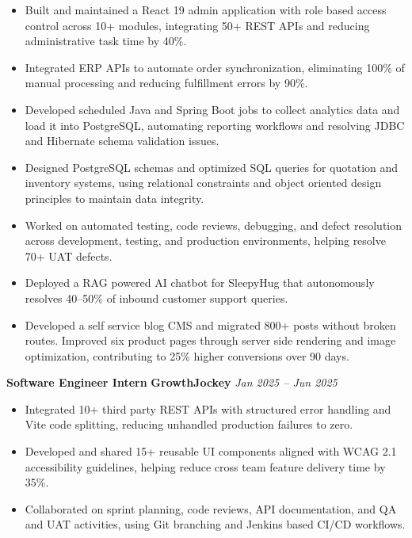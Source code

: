 \documentclass[a4paper,10pt]{article}
\newcommand{\rolerow}[3]{%
    \noindent
    {\bfseries\color{dark}#1}\enspace
    {\bfseries\color{accent}#2}%
    \hfill{\small\color{light}\itshape #3}%
}
\begin{document}
\begin{itemize}

\item Built and maintained a React 19 admin application with role based
access control across 10+ modules, integrating 50+ REST APIs and
reducing administrative task time by 40\%.

\item Integrated ERP APIs to automate order synchronization, eliminating
100\% of manual processing and reducing fulfillment errors by 90\%.

\item Developed scheduled Java and Spring Boot jobs to collect analytics
data and load it into PostgreSQL, automating reporting workflows and
resolving JDBC and Hibernate schema validation issues.

\item Designed PostgreSQL schemas and optimized SQL queries for
quotation and inventory systems, using relational constraints and
object oriented design principles to maintain data integrity.

\item Worked on automated testing, code reviews, debugging, and defect
resolution across development, testing, and production environments,
helping resolve 70+ UAT defects.

\item Deployed a RAG powered AI chatbot for SleepyHug that autonomously
resolves 40--50\% of inbound customer support queries.

\item Developed a self service blog CMS and migrated 800+ posts without
broken routes. Improved six product pages through server side rendering
and image optimization, contributing to 25\% higher conversions over
90 days.

\end{itemize}

\vspace{3pt}

\rolerow{Software Engineer Intern}{GrowthJockey}{Jan 2025 -- Jun 2025}

\vspace{2pt}

\begin{itemize}

\item Integrated 10+ third party REST APIs with structured error handling
and Vite code splitting, reducing unhandled production failures to zero.

\item Developed and shared 15+ reusable UI components aligned with
WCAG 2.1 accessibility guidelines, helping reduce cross team feature
delivery time by 35\%.

\item Collaborated on sprint planning, code reviews, API documentation,
and QA and UAT activities, using Git branching and Jenkins based
CI/CD workflows.

\end{itemize}
\end{document}
